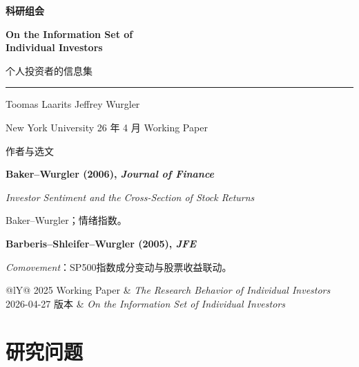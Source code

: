 \begin{frame}[plain]
  \vfill
  {\small\color{wine}\bfseries 科研组会\par}
  \vspace{5mm}
  {\fontsize{22}{26}\selectfont\bfseries On the Information Set of\\Individual Investors\par}
  \vspace{3mm}
  {\large\color{wine}个人投资者的信息集\par}
  \vspace{3mm}
  {\color{wine}\rule{.95\linewidth}{.75pt}}\par\medskip
  Toomas Laarits \quad Jeffrey Wurgler\par
  {\small New York University \hfill 26 年 4 月 Working Paper}\par
  \vspace{4mm}{\small 汇报人：杨博远\quad 27国金博0}\vfill
\end{frame}

\begin{frame}[label=authors]{作者与选文}
  \smallskip
  {\small
  \textbf{Baker--Wurgler (2006), \textit{Journal of Finance}}\par
  \textit{Investor Sentiment and the Cross-Section of Stock Returns}\par
  Baker--Wurgler；情绪指数。\par\smallskip
  \textbf{Barberis--Shleifer--Wurgler (2005), \textit{JFE}}\par
  \textit{Comovement}：SP500指数成分变动与股票收益联动。\par}
  \smallskip
  \smallskip\small
  \begin{tabularx}{\linewidth}{@{}lY@{}}
    2025 Working Paper & \textit{The Research Behavior of Individual Investors}\\
    2026-04-27 版本 & \textit{On the Information Set of Individual Investors}
  \end{tabularx}
\end{frame}

\section{研究问题}

